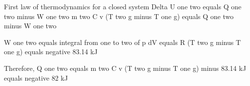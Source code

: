 First law of thermodynamics for a closed system  
Delta U one two equals Q one two minus W one two  
m two C v (T two g minus T one g) equals Q one two minus W one two  

W one two equals integral from one to two of p dV  
equals R (T two g minus T one g)  
equals negative 83.14 kJ  

Therefore, Q one two equals m two C v (T two g minus T one g) minus 83.14 kJ  
equals negative 82 kJ